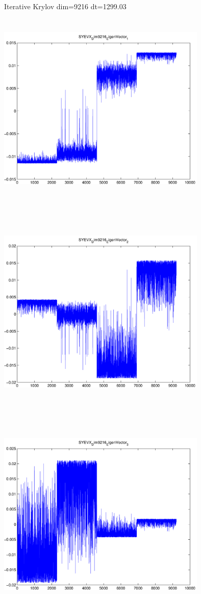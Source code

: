 \documentclass[9pt]{article}
\theoremstyle{plain}
\theoremstyle{definition}
\theoremstyle{remark}
\numberwithin{equation}{section}
\begin{document}
Iterative Krylov dim=9216 dt=1299.03
\includegraphics[width=10.0cm,height=10.0cm]{SYEVX_Dim9216_EigenVector_1.pdf}

\includegraphics[width=10.0cm,height=10.0cm]{SYEVX_Dim9216_EigenVector_2.pdf}

\includegraphics[width=10.0cm,height=10.0cm]{SYEVX_Dim9216_EigenVector_3.pdf}
\end{document}
